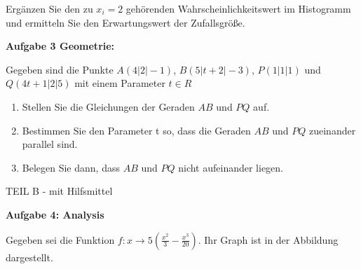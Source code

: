 \documentclass[a4paper,12pt]{article}
\newcommand{\Aufgabe}[1]{
  {
  \vspace*{0.5cm}
  \textsf{\textbf{Aufgabe #1}}
  \vspace*{0.2cm}
  
  }
}
\begin{document}

Ergänzen Sie den zu $x_i=2$ gehörenden Wahrscheinlichkeitswert im Histogramm und ermitteln Sie den Erwartungswert der Zufallsgröße.

\Aufgabe{3 Geometrie:}

 Gegeben sind die Punkte  $ A(4 | 2 |-1)$, $ B(5 | t+2 |-3)$, $ P(1 | 1 |1)$ und $ Q(4t+1 | 2 |5)$ mit einem  Parameter $t \in R$

\begin{enumerate}[label={\alph*)}] 
\item Stellen Sie die Gleichungen der Geraden $AB$ und $PQ$ auf.
\item Bestimmen Sie den Parameter t so, dass die Geraden $AB$ und $PQ$ zueinander parallel sind.
\item Belegen Sie dann, dass $AB$ und $PQ$ nicht aufeinander liegen.
\end{enumerate}



\newpage
\enlargethispage{2cm}
{TEIL B} - mit Hilfsmittel


\Aufgabe{4: Analysis}
Gegeben sei die Funktion $f: x\rightarrow 5 (\frac{x^2}{3}-\frac{x^3}{20} )$.
Ihr Graph ist in der Abbildung dargestellt.\\
\end{document}
